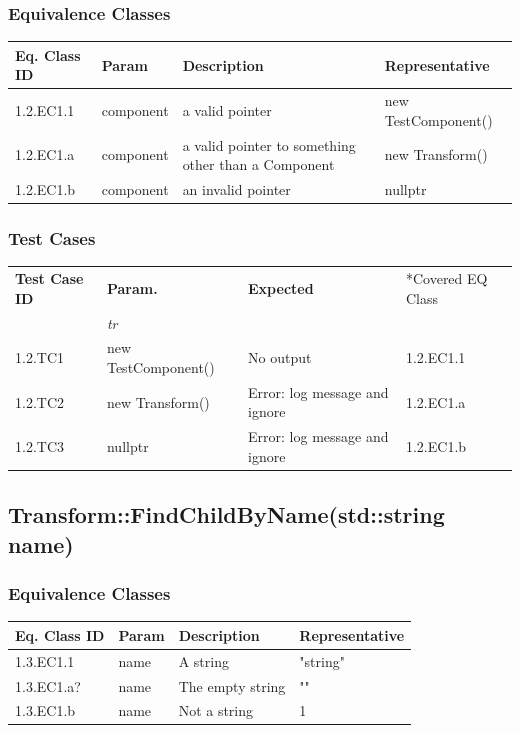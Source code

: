 \documentclass[11pt]{article}
\begin{document}
\subsubsection*{Equivalence Classes}
\label{sec:org4fc956e}
\begin{center}
\begin{tabularx}{\textwidth}{lXXX}
\hline
\textbf{Eq. Class ID} & \textbf{Param} & \textbf{Description} & \textbf{Representative}\\
\hline
1.2.EC1.1 & component & a valid pointer & new TestComponent()\\
\hline
1.2.EC1.a & component & a valid pointer to something other than a Component & new Transform()\\
\hline
1.2.EC1.b & component & an invalid pointer & nullptr\\
\hline
\end{tabularx}
\end{center}
\subsubsection*{Test Cases}
\label{sec:orga9c85fa}
\begin{center}
\begin{tabularx}{\textwidth}{lXXX}
\hline
\textbf{Test Case ID} & \textbf{Param.} & \textbf{Expected} & *Covered EQ Class\\
 & \textit{tr} &  & \\
\hline
1.2.TC1 & new TestComponent() & No output & 1.2.EC1.1\\
\hline
1.2.TC2 & new Transform() & Error: log message and ignore & 1.2.EC1.a\\
\hline
1.2.TC3 & nullptr & Error: log message and ignore & 1.2.EC1.b\\
\hline
\end{tabularx}
\end{center}
\subsection{Transform::FindChildByName(std::string name)}
\label{sec:orgab10137}
\subsubsection*{Equivalence Classes}
\label{sec:orgd8ce0a0}
\begin{center}
\begin{tabularx}{\textwidth}{lXXX}
\hline
\textbf{Eq. Class ID} & \textbf{Param} & \textbf{Description} & \textbf{Representative}\\
\hline
1.3.EC1.1 & name & A string & "string"\\
\hline
1.3.EC1.a? & name & The empty string & ""\\
\hline
1.3.EC1.b & name & Not a string & 1\\
\hline
\end{tabularx}
\end{center}
\end{document}
